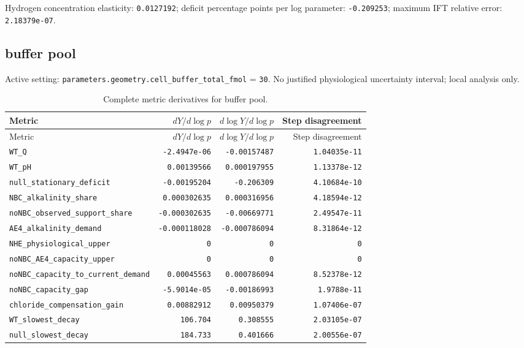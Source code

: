 Hydrogen concentration elasticity: \texttt{0.0127192}; deficit percentage points per log parameter: \texttt{-0.209253}; maximum IFT relative error: \texttt{2.18379e-07}.\par

\subsection*{buffer pool}
Active setting: \nolinkurl{parameters.geometry.cell_buffer_total_fmol} = \texttt{30}. No justified physiological uncertainty interval; local analysis only.


\begingroup\scriptsize
\setlength{\tabcolsep}{3pt}
\begin{longtable}{p{.44\linewidth}rrr}
\caption{Complete metric derivatives for buffer pool.}\\
\toprule
Metric & $dY/d\log p$ & $d\log Y/d\log p$ & Step disagreement \\
\midrule\endfirsthead
\toprule
Metric & $dY/d\log p$ & $d\log Y/d\log p$ & Step disagreement \\
\midrule\endhead
\bottomrule\endfoot
\nolinkurl{WT_Q} & \texttt{-2.4947e-06} & \texttt{-0.00157487} & \texttt{1.04035e-11} \\
\nolinkurl{WT_pH} & \texttt{0.00139566} & \texttt{0.000197955} & \texttt{1.13378e-12} \\
\nolinkurl{null_stationary_deficit} & \texttt{-0.00195204} & \texttt{-0.206309} & \texttt{4.10684e-10} \\
\nolinkurl{NBC_alkalinity_share} & \texttt{0.000302635} & \texttt{0.000316956} & \texttt{4.18594e-12} \\
\nolinkurl{noNBC_observed_support_share} & \texttt{-0.000302635} & \texttt{-0.00669771} & \texttt{2.49547e-11} \\
\nolinkurl{AE4_alkalinity_demand} & \texttt{-0.000118028} & \texttt{-0.000786094} & \texttt{8.31864e-12} \\
\nolinkurl{NHE_physiological_upper} & \texttt{0} & \texttt{0} & \texttt{0} \\
\nolinkurl{noNBC_AE4_capacity_upper} & \texttt{0} & \texttt{0} & \texttt{0} \\
\nolinkurl{noNBC_capacity_to_current_demand} & \texttt{0.00045563} & \texttt{0.000786094} & \texttt{8.52378e-12} \\
\nolinkurl{noNBC_capacity_gap} & \texttt{-5.9014e-05} & \texttt{-0.00186993} & \texttt{1.9788e-11} \\
\nolinkurl{chloride_compensation_gain} & \texttt{0.00882912} & \texttt{0.00950379} & \texttt{1.07406e-07} \\
\nolinkurl{WT_slowest_decay} & \texttt{106.704} & \texttt{0.308555} & \texttt{2.03105e-07} \\
\nolinkurl{null_slowest_decay} & \texttt{184.733} & \texttt{0.401666} & \texttt{2.00556e-07} \\
\end{longtable}
\endgroup

